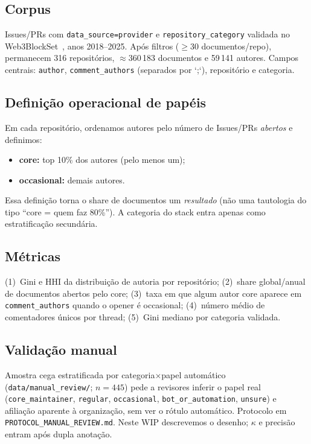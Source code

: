 \documentclass[10pt,conference]{IEEEtran}
\begin{document}
\subsection{Corpus}
Issues/PRs com \texttt{data\_source=provider} e \texttt{repository\_category} validada no Web3BlockSet~\cite{soares2026web3blockset}, anos 2018--2025. Após filtros ($\geq$30 documentos/repo), permanecem 316 repositórios, $\approx$360\,183 documentos e 59\,141 autores. Campos centrais: \texttt{author}, \texttt{comment\_authors} (separados por `;`), repositório e categoria.

\subsection{Definição operacional de papéis}
Em cada repositório, ordenamos autores pelo número de Issues/PRs \emph{abertos} e definimos:
\begin{itemize}
\item \textbf{core:} top 10\% dos autores (pelo menos um);
\item \textbf{occasional:} demais autores.
\end{itemize}
Essa definição torna o share de documentos um \emph{resultado} (não uma tautologia do tipo ``core = quem faz 80\%''). A categoria do stack entra apenas como estratificação secundária.

\subsection{Métricas}
(1)~Gini e HHI da distribuição de autoria por repositório; (2)~share global/anual de documentos abertos pelo core; (3)~taxa em que algum autor core aparece em \texttt{comment\_authors} quando o opener é occasional; (4)~número médio de comentadores únicos por thread; (5)~Gini mediano por categoria validada.

\subsection{Validação manual}
Amostra cega estratificada por categoria$\times$papel automático (\texttt{data/manual\_review/}; $n{=}445$) pede a revisores inferir o papel real (\texttt{core\_maintainer}, \texttt{regular}, \texttt{occasional}, \texttt{bot\_or\_automation}, \texttt{unsure}) e afiliação aparente à organização, sem ver o rótulo automático. Protocolo em \texttt{PROTOCOL\_MANUAL\_REVIEW.md}. Neste WIP descrevemos o desenho; $\kappa$ e precisão entram após dupla anotação.
\end{document}
